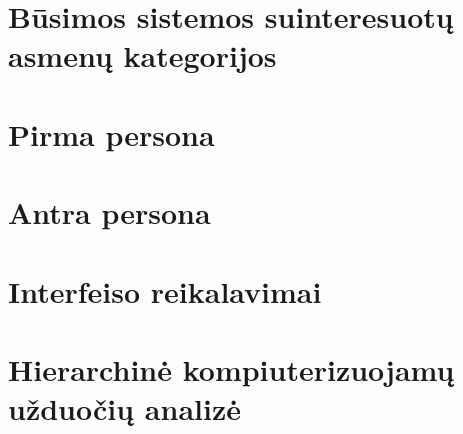   

  \section{Būsimos sistemos suinteresuotų asmenų kategorijos}
  

  \section{Pirma persona}
  

  \section{Antra persona}
  

  \section{Interfeiso reikalavimai}
  

  \section{Hierarchinė kompiuterizuojamų užduočių analizė}
  
